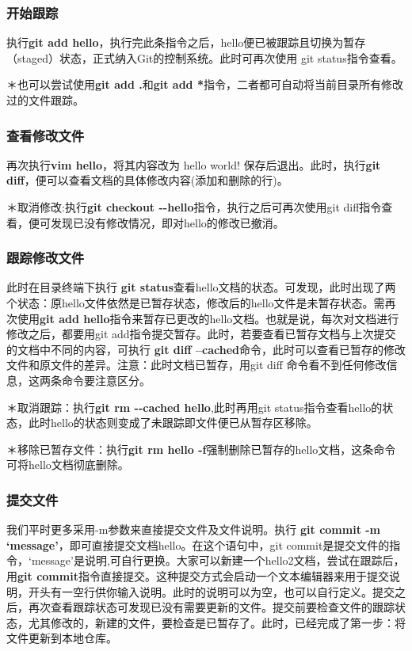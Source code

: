 \documentclass{article}
\begin{document}
\subsubsection{开始跟踪}
执行\textbf{git add hello}，执行完此条指令之后，hello便已被跟踪且切换为暂存（staged）状态，正式纳入Git的控制系统。此时可再次使用 git status指令查看。

＊也可以尝试使用\textbf{git add .}和\textbf{git add  *}指令，二者都可自动将当前目录所有修改过的文件跟踪。
\subsubsection{查看修改文件}
再次执行\textbf{vim hello}，将其内容改为 hello world! 保存后退出。此时，执行\textbf{git diff}，便可以查看文档的具体修改内容(添加和删除的行)。

＊取消修改:执行\textbf{git checkout {-}{-}hello}指令，执行之后可再次使用git diff指令查看，便可发现已没有修改情况，即对hello的修改已撤消。
\subsubsection{跟踪修改文件}
此时在目录终端下执行 \textbf{git status}查看hello文档的状态。可发现，此时出现了两个状态：原hello文件依然是已暂存状态，修改后的hello文件是未暂存状态。需再次使用\textbf{git add hello}指令来暂存已更改的hello文档。也就是说，每次对文档进行修改之后，都要用git add指令提交暂存。此时，若要查看已暂存文档与上次提交的文档中不同的内容，可执行 \textbf{git diff --cached}命令，此时可以查看已暂存的修改文件和原文件的差异。注意：此时文档已暂存，用git diff 命令看不到任何修改信息，这两条命令要注意区分。

＊取消跟踪：执行\textbf{git rm {-}{-}cached hello},此时再用git status指令查看hello的状态，此时hello的状态则变成了未跟踪即文件便已从暂存区移除。

＊移除已暂存文件：执行\textbf{git rm hello -f}强制删除已暂存的hello文档，这条命令可将hello文档彻底删除。
\subsubsection{提交文件}
我们平时更多采用-m参数来直接提交文件及文件说明。执行 \textbf{git commit -m `message'}，即可直接提交文档hello。在这个语句中，git commit是提交文件的指令，`message'是说明,可自行更换。大家可以新建一个hello2文档，尝试在跟踪后，用\textbf{git commit}指令直接提交。这种提交方式会启动一个文本编辑器来用于提交说明，开头有一空行供你输入说明。此时的说明可以为空，也可以自行定义。提交之后，再次查看跟踪状态可发现已没有需要更新的文件。提交前要检查文件的跟踪状态，尤其修改的，新建的文件，要检查是已暂存了。此时，已经完成了第一步：将文件更新到本地仓库。
\end{document}
